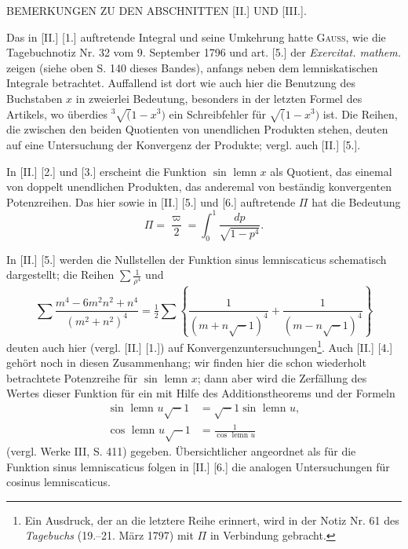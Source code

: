 \begingroup
\setlength{\headheight}{25pt}
\begin{center}\small BEMERKUNGEN ZU DEN ABSCHNITTEN [II.] UND [III.].\end{center}
\par\indent Das in [II.] [1.] auftretende Integral und seine Umkehrung hatte \textsc{Gauss}, wie die Tagebuchnotiz Nr. 32 vom 9. September 1796 und art. [5.] der \textit{Exercitat. mathem.} zeigen (siehe oben S. 140 dieses Bandes), anfangs neben dem lemniskatischen Integrale betrachtet. Auffallend ist dort wie auch hier die Benutzung des Buchstaben \(x\) in zweierlei Bedeutung, besonders in der letzten Formel des Artikels, wo überdies \({}^3\!\surd(1-x^3)\) ein Schreibfehler für \(\surd(1-x^3)\) ist. Die Reihen, die zwischen den beiden Quotienten von unendlichen Produkten stehen, deuten auf eine Untersuchung der Konvergenz der Produkte; vergl. auch [II.] [5.].

In [II.] [2.] und [3.] erscheint die Funktion \(\sin\text{ lemn }x\) als Quotient, das einemal von doppelt unendlichen Produkten, das anderemal von beständig konvergenten Potenzreihen. Das hier sowie in [II.] [5.] und [6.] auftretende \(\Pi\) hat die Bedeutung
\[\Pi=\frac{\varpi}{2}=\int_0^1\frac{dp}{\sqrt{1-p^4}}.\]

In [II.] [5.] werden die Nullstellen der Funktion sinus lemniscaticus schematisch dargestellt; die Reihen \(\sum\frac1{\rho^4}\) und
\[\sum\frac{m^4-6m^2n^2+n^4}{(m^2+n^2)^4}=\tfrac12\sum\left\{\frac1{(m+n\surd-1)^4}+\frac1{(m-n\surd-1)^4}\right\}\]
deuten auch hier (vergl. [II.] [1.]) auf Konvergenzuntersuchungen\footnote{Ein Ausdruck, der an die letztere Reihe erinnert, wird in der Notiz Nr. 61 des \textit{Tagebuchs} (19.--21. März 1797) mit \(\Pi\) in Verbindung gebracht.}.
\clearpage
{}\fancyhead{}
Auch [II.] [4.] gehört noch in diesen Zusammenhang; wir finden hier die schon wiederholt betrachtete Potenzreihe für \(\sin\text{ lemn }x\); dann aber wird die Zerfällung des Wertes dieser Funktion für ein  mit Hilfe des Additionstheorems und der Formeln
\[\begin{aligned}
\sin\text{ lemn }u\surd-1&=\surd-1\sin\text{ lemn }u,\\
\cos\text{ lemn }u\surd-1&=\frac1{\cos\text{ lemn }u}
\end{aligned}\]
(vergl. Werke III, S. 411) gegeben. Übersichtlicher angeordnet als für die Funktion sinus lemniscaticus folgen in [II.] [6.] die analogen Untersuchungen für cosinus lemniscaticus.

